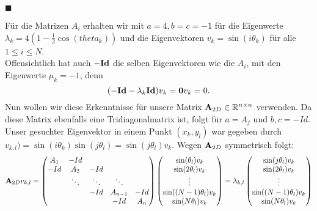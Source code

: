\begin{flushright}
$\blacksquare$
\end{flushright}
Für die Matrizen $A_{i}$ erhalten wir mit $a = 4, b = c = -1$ für die Eigenwerte $\lambda_{k} = 4 (1 - \frac{1}{2} \cos(theta_{k}))$ und die Eigenvektoren $v_{k} = \sin(i\theta_{k})$ für alle $1 \le i \le N$.\\
Offensichtlich hat auch $-{\textbf{Id}}$ die selben Eigenvektoren wie die $A_{i}$, mit den Eigenwerte $\mu_{k} = -1$, denn
\begin{equation}
(-{\textbf{Id}} - \lambda_{k}{\textbf{Id}}) v_{k} = {\textbf{0}} v_{k} = 0.
\end{equation}
Nun wollen wir diese Erkenntnisse für unsere Matrix ${\textbf{A}}_{2D} \in \mathbb{R}^{n \times n}$ verwenden. Da diese Matrix ebenfalls eine Tridiagonalmatrix ist, folgt für $a = A_{j}$ und $b,c = -Id$.\\
Unser gesuchter Eigenvektor in einem Punkt $(x_{k},y_{l})$ war gegeben durch $v_{k,l}) = \sin(i\theta_{k}) \sin(j\theta_{l}) = \sin(j\theta_{l})v_{k}$.  Wegen ${\textbf{A}}_{2D}$ symmetrisch folgt:
\begin{equation}
{\textbf{A}}_{2D}v_{k,l} = 
\begin{pmatrix}
A_{1} & -Id\\
-Id & A_{2} & -Id\\
    & \ddots & \ddots & \ddots\\
   	&		 & -Id    & A_{n-1} & -Id\\
   	&		 &		  & -Id    & A_{n}
\end{pmatrix}
\begin{pmatrix}
\sin(\theta_{l}) v_{k}\\
\sin(2\theta_{l}) v_{k}\\
\vdots\\
\sin((N-1)\theta_{l}) v_{k}\\
\sin(N\theta_{l}) v_{k}\\
\end{pmatrix}
= \lambda_{k,l}
\begin{pmatrix}
\sin(j\theta_{l}) v_{k}\\
\sin(2\theta_{l}) v_{k}\\
\vdots\\
\sin((N-1)\theta_{l}) v_{k}\\
\sin(N\theta_{l}) v_{k}\\
\end{pmatrix}\notag
\end{equation}

